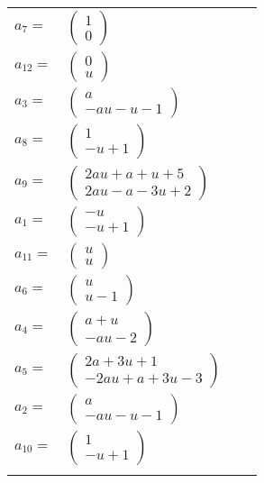 \documentclass[1p]{elsarticle_modified}
\theoremstyle{definition}
\begin{document}
\begin{tabular}{m{7pt} m{180pt} m{7pt} m{180pt} }
\flushright $a_{7}=$&$\begin{pmatrix}1\\0\end{pmatrix}$ \\
\flushright $a_{12}=$&$\begin{pmatrix}0\\u\end{pmatrix}$ \\
\flushright $a_{3}=$&$\begin{pmatrix}a\\- a u- u-1\end{pmatrix}$ \\
\flushright $a_{8}=$&$\begin{pmatrix}1\\- u+1\end{pmatrix}$ \\
\flushright $a_{9}=$&$\begin{pmatrix}2 a u+a+u+5\\2 a u- a-3 u+2\end{pmatrix}$ \\
\flushright $a_{1}=$&$\begin{pmatrix}- u\\- u+1\end{pmatrix}$ \\
\flushright $a_{11}=$&$\begin{pmatrix}u\\u\end{pmatrix}$ \\
\flushright $a_{6}=$&$\begin{pmatrix}u\\u-1\end{pmatrix}$ \\
\flushright $a_{4}=$&$\begin{pmatrix}a+u\\- a u-2\end{pmatrix}$ \\
\flushright $a_{5}=$&$\begin{pmatrix}2 a+3 u+1\\-2 a u+a+3 u-3\end{pmatrix}$ \\
\flushright $a_{2}=$&$\begin{pmatrix}a\\- a u- u-1\end{pmatrix}$ \\
\flushright $a_{10}=$&$\begin{pmatrix}1\\- u+1\end{pmatrix}$\\&\end{tabular}
\end{document}
